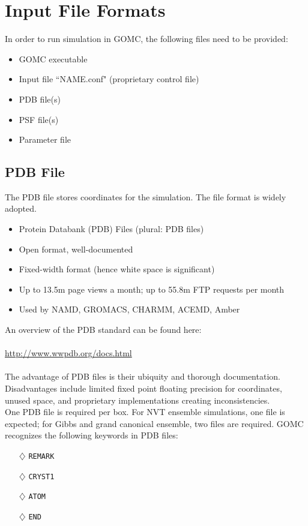 \newpage

\section{Input File Formats}
In order to run simulation in GOMC, the following files need to be provided:
\begin{itemize}
\item GOMC executable
\item Input file ``NAME.conf" (proprietary control file)
\item PDB file(s)
\item PSF file(s)
\item Parameter file
\end{itemize}
\subsection{PDB File}
The PDB file stores coordinates for the simulation. The file format is widely adopted.
\begin{itemize}
\item Protein Databank (PDB) Files (plural: PDB files)
\item Open format, well-documented
\item Fixed-width format (hence white space is significant)
\item Up to 13.5m page views a month; up to 55.8m FTP requests per month
\item Used by NAMD, GROMACS, CHARMM, ACEMD, Amber
\end{itemize}
An overview of the PDB standard can be found here:\\\\
\url{http://www.wwpdb.org/docs.html}\\\\
The advantage of PDB files is their ubiquity and thorough documentation. Disadvantages include limited fixed point floating precision for coordinates, unused space, and proprietary implementations creating inconsistencies.\\
One PDB file is required per box. For NVT ensemble simulations, one file is expected; for Gibbs and grand canonical ensemble, two files are required.
GOMC recognizes the following keywords in PDB files:
\begin{itemize}
\item[$\diamondsuit$] \texttt{REMARK}
\item[$\diamondsuit$] \texttt{CRYST1}
\item[$\diamondsuit$] \texttt{ATOM}
\item[$\diamondsuit$] \texttt{END}
\end{itemize}
